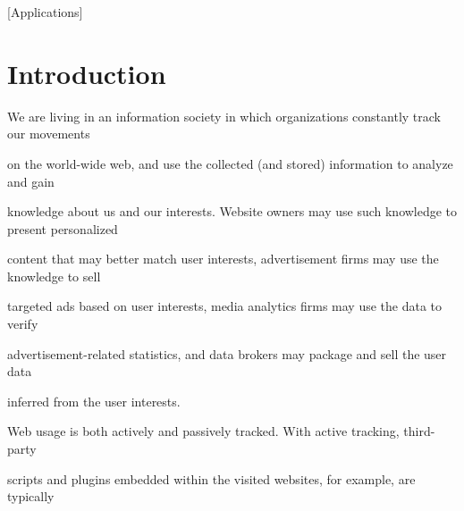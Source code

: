 \documentclass{sig-alternate-10pt}
\begin{document}





[Applications] 













\section{Introduction}



We are living in an information society in which organizations constantly track our movements 

on the world-wide web, and use the collected (and stored) information to analyze and gain 

knowledge about us and our interests.  Website owners may use such knowledge to present personalized 

content that may better match user interests, advertisement firms may use the knowledge to sell 

targeted ads based on user interests, media analytics firms may use the data to verify 

advertisement-related statistics, and data brokers may package and sell the user data 

inferred from the user interests.



Web usage is both actively and passively tracked.  With active tracking, third-party 

scripts and plugins embedded within the visited websites, for example, are typically 
\end{document}
